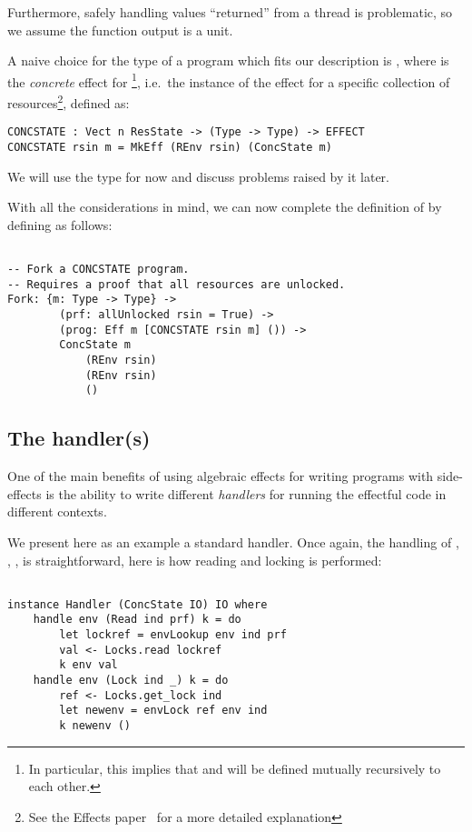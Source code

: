 Furthermore, safely handling values ``returned'' from a thread is problematic, so
we assume the function output is a unit.

A naive choice for the type of a program which fits our description is
, where  is the
\emph{concrete} effect for {\footnote{In
particular, this implies that  and  will be
defined mutually recursively to each other.}}, i.e.~the
instance of the effect for a specific collection of resources\footnote{See the
Effects paper~\cite[p.~2]{effects-idr} for a more detailed explanation},
defined as:

\begin{BVerbatim}
CONCSTATE : Vect n ResState -> (Type -> Type) -> EFFECT
CONCSTATE rsin m = MkEff (REnv rsin) (ConcState m)
\end{BVerbatim}

We will use the type  for now and discuss
problems raised by it later.

With all the considerations in mind, we can now complete the definition of
 by defining  as follows:

\begin{BVerbatim}

-- Fork a CONCSTATE program.
-- Requires a proof that all resources are unlocked.
Fork: {m: Type -> Type} ->
        (prf: allUnlocked rsin = True) ->
        (prog: Eff m [CONCSTATE rsin m] ()) ->
        ConcState m
            (REnv rsin)
            (REnv rsin)
            ()

\end{BVerbatim}

\subsection{The handler(s)}

One of the main benefits of using algebraic effects for writing programs with
side-effects is the ability to write different \emph{handlers} for running the
effectful code in different contexts.

We present here as an example a standard  handler. Once again, the
handling of , , ,  is
straightforward, here is how reading and locking is performed:

\begin{BVerbatim}

instance Handler (ConcState IO) IO where
    handle env (Read ind prf) k = do
        let lockref = envLookup env ind prf
        val <- Locks.read lockref
        k env val
    handle env (Lock ind _) k = do
        ref <- Locks.get_lock ind
        let newenv = envLock ref env ind
        k newenv ()

\end{BVerbatim}

